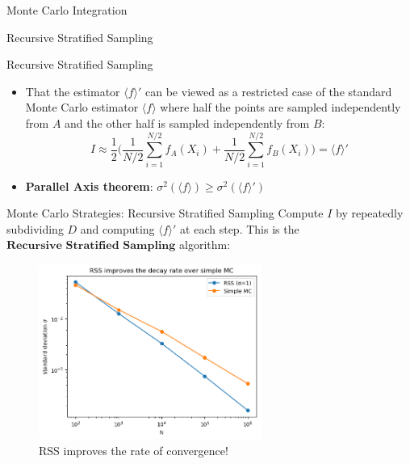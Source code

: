\documentclass{beamer}
\begin{document}
\begin{section}{Monte Carlo Integration}
\begin{subsection}{Recursive Stratified Sampling}
    \begin{frame}{Recursive Stratified Sampling}
    \begin{itemize}
    \item That the estimator \(\langle f \rangle '\) can be viewed as a restricted case of the standard Monte Carlo estimator \(\langle f \rangle\) where half the points are sampled independently from \(A\) and the other half is sampled independently from \(B\):
    \pause
   $$I \approx \frac{1}{2}\Big(\frac{1}{N/2}\sum_{i=1}^{N/2}f_{A}(X_i) + \frac{1}{N/2}\sum_{i=1}^{N/2}f_{B}(X_i)\Big) = \langle f \rangle '$$
   \pause
   \item \textbf{Parallel Axis theorem}: $\sigma^2(\langle f \rangle) \geq \sigma^{2}(\langle f \rangle ')$
\end{itemize}
\end{frame}

\begin{frame}{Monte Carlo Strategies: Recursive Stratified Sampling}
    Compute $I$ by repeatedly subdividing $D$ and computing $\langle f \rangle '$ at each step. This is the $\textbf{Recursive Stratified Sampling}$ algorithm: 
    \pause
    \begin{figure}
        \centering
        \includegraphics[width=0.65\textwidth]{output_22_0.png}
        \caption{RSS improves the rate of convergence!}
        \label{fig:RSS vs SMC}
    \end{figure}
\end{frame}
\end{subsection}


\end{section}
\end{document}
